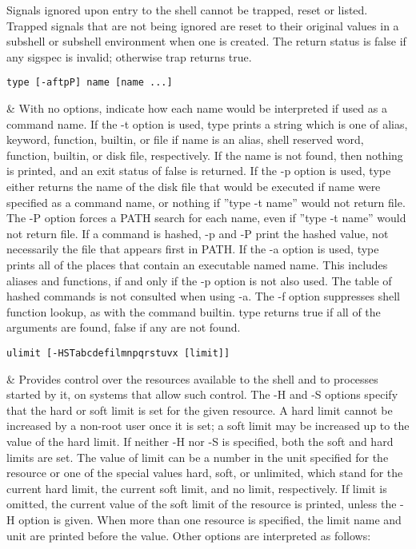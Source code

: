 {{{{{{\begin{longtable}
{{Signals ignored upon entry to the shell cannot be trapped, reset or listed. Trapped signals that are not being ignored are reset to their original values in a subshell or subshell environment when one is created. The return status is false if any sigspec is invalid; otherwise trap returns true. \\

\begin{lstlisting}
type [-aftpP] name [name ...]
\end{lstlisting} &
With no options, indicate how each name would be interpreted if used as a command name. If the -t option is used, type prints a string which is one of alias, keyword, function, builtin, or file if name is an alias, shell reserved word, function, builtin, or disk file, respectively. If the name is not found, then nothing is printed, and an exit status of false is returned. If the -p option is used, type either returns the name of the disk file that would be executed if name were specified as a command name, or nothing if ''type -t name'' would not return file. The -P option forces a PATH search for each name, even if ''type -t name'' would not return file. If a command is hashed, -p and -P print the hashed value, not necessarily the file that appears first in PATH. If the -a option is used, type prints all of the places that contain an executable named name. This includes aliases and functions, if and only if the -p option is not also used. The table of hashed commands is not consulted when using -a. The -f option suppresses shell function lookup, as with the command builtin. type returns true if all of the arguments are found, false if any are not found. \\

\begin{lstlisting}
ulimit [-HSTabcdefilmnpqrstuvx [limit]]
\end{lstlisting} &
Provides control over the resources available to the shell and to processes started by it, on systems that allow such control. The -H and -S options specify that the hard or soft limit is set for the given resource. A hard limit cannot be increased by a non-root user once it is set; a soft limit may be increased up to the value of the hard limit. If neither -H nor -S is specified, both the soft and hard limits are set. The value of limit can be a number in the unit specified for the resource or one of the special values hard, soft, or unlimited, which stand for the current hard limit, the current soft limit, and no limit, respectively. If limit is omitted, the current value of the soft limit of the resource is printed, unless the -H option is given. When more than one resource is specified, the limit name and unit are printed before the value. Other options are interpreted as follows:

}}
\end{longtable}}}}}}}
